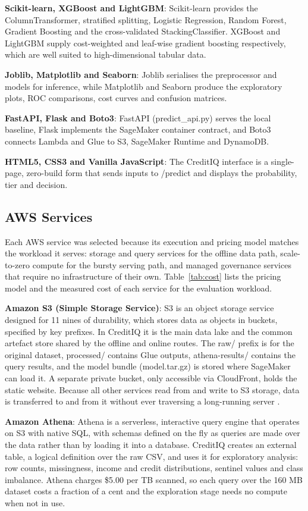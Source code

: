 \documentclass[conference]{IEEEtran}
\begin{document}
\textbf{Scikit-learn, XGBoost and LightGBM}: Scikit-learn provides the ColumnTransformer, stratified splitting, Logistic Regression, Random Forest, Gradient Boosting and the cross-validated StackingClassifier. XGBoost and LightGBM supply cost-weighted and leaf-wise gradient boosting respectively, which are well suited to high-dimensional tabular data.

\textbf{Joblib, Matplotlib and Seaborn}: Joblib serialises the preprocessor and models for inference, while Matplotlib and Seaborn produce the exploratory plots, ROC comparisons, cost curves and confusion matrices.

\textbf{FastAPI, Flask and Boto3}: FastAPI (predict\_api.py) serves the local baseline, Flask implements the SageMaker container contract, and Boto3 connects Lambda and Glue to S3, SageMaker Runtime and DynamoDB.

\textbf{HTML5, CSS3 and Vanilla JavaScript}: The CreditIQ interface is a single-page, zero-build form that sends inputs to /predict and displays the probability, tier and decision.

\subsection{AWS Services}
Each AWS service was selected because its execution and pricing model matches the workload it serves: storage and query services for the offline data path, scale-to-zero compute for the bursty serving path, and managed governance services that require no infrastructure of their own. Table~\ref{tab:cost} lists the pricing model and the measured cost of each service for the evaluation workload.

\textbf{Amazon S3 (Simple Storage Service)}: S3 is an object storage service designed for 11 nines of durability, which stores data as objects in buckets, specified by key prefixes. In CreditIQ it is the main data lake and the common artefact store shared by the offline and online routes. The raw/ prefix is for the original dataset, processed/ contains Glue outputs, athena-results/ contains the query results, and the model bundle (model.tar.gz) is stored where SageMaker can load it. A separate private bucket, only accessible via CloudFront, holds the static website. Because all other services read from and write to S3 storage, data is transferred to and from it without ever traversing a long-running server \cite{9}.

\textbf{Amazon Athena}: Athena is a serverless, interactive query engine that operates on S3 with native SQL, with schemas defined on the fly as queries are made over the data rather than by loading it into a database. CreditIQ creates an external table, a logical definition over the raw CSV, and uses it for exploratory analysis: row counts, missingness, income and credit distributions, sentinel values and class imbalance. Athena charges \$5.00 per TB scanned, so each query over the 160 MB dataset costs a fraction of a cent and the exploration stage needs no compute when not in use.
\end{document}
